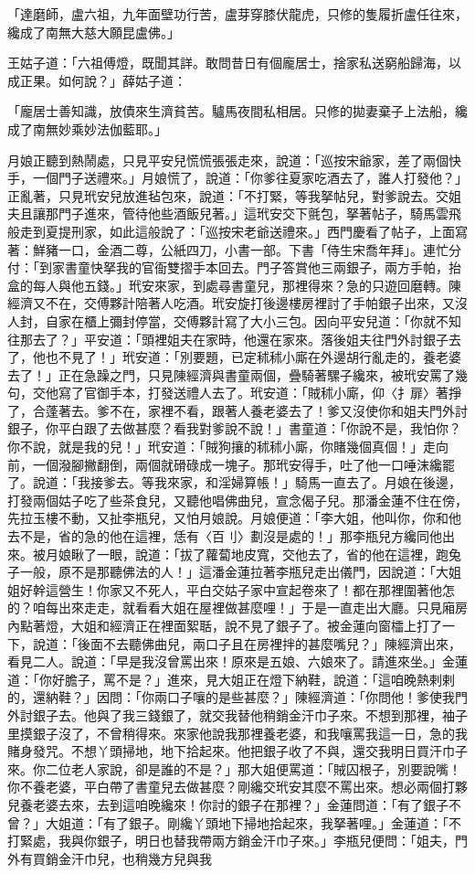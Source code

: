 「達磨師，盧六祖，九年面壁功行苦，盧芽穿膝伏龍虎，只修的隻履折盧任往來，纔成了南無大慈大願昆盧佛。」

王姑子道：「六祖傅燈，既聞其詳。敢問昔日有個龐居士，捨家私送窮船歸海，以成正果。如何說？」薛姑子道：

「龐居士善知識，放債來生濟貧苦。驢馬夜間私相居。只修的拋妻棄子上法船，纔成了南無妙乘妙法伽藍耶。」

月娘正聽到熱鬧處，只見平安兒慌慌張張走來，說道：「巡按宋爺家，差了兩個快手，一個門子送禮來。」月娘慌了，說道：「你爹往夏家吃酒去了，誰人打發他？」正亂著，只見玳安兒放進毡包來，說道：「不打緊，等我拏帖兒，對爹說去。交姐夫且讓那門子進來，管待他些酒飯兒著。」這玳安交下氈包，拏著帖子，騎馬雲飛般走到夏提刑家，如此這般說了：「巡按宋老爺送禮來。」西門慶看了帖子，上面寫著：鮮豬一口，金酒二尊，公紙四刀，小書一部。下書「侍生宋喬年拜」。連忙分付：「到家書童快拏我的官衙雙摺手本回去。門子答賞他三兩銀子，兩方手帕，抬盒的每人與他五錢。」玳安來家，到處尋書童兒，那裡得來？急的只遊回磨轉。陳經濟又不在，交傅夥計陪著人吃酒。玳安旋打後邊樓房裡討了手帕銀子出來，又沒人封，自家在櫃上彌封停當，交傅夥計寫了大小三包。因向平安兒道：「你就不知往那去了？」平安道：「頭裡姐夫在家時，他還在家來。落後姐夫往門外討銀子去了，他也不見了！」玳安道：「別要題，已定秫秫小廝在外邊胡行亂走的，養老婆去了！」正在急躁之門，只見陳經濟與書童兩個，疊騎著騾子纔來，被玳安罵了幾句，交他寫了官御手本，打發送禮人去了。玳安道：「賊秫小廝，仰〈扌扉〉著掙了，合蓬著去。爹不在，家裡不看，跟著人養老婆去了！爹又沒使你和姐夫門外討銀子，你平白跟了去做甚麼？看我對爹說不說！」書童道：「你說不是，我怕你？你不說，就是我的兒！」玳安道：「賊狗攘的秫秫小廝，你賭幾個真個！」走向前，一個潑腳撇翻倒，兩個就磆碌成一塊子。那玳安得手，吐了他一口唾沫纔罷了。說道：「我接爹去。等我來家，和淫婦算帳！」騎馬一直去了。月娘在後邊，打發兩個姑子吃了些茶食兒，又聽他唱佛曲兒，宣念偈子兒。那潘金蓮不住在傍，先拉玉樓不動，又扯李瓶兒，又怕月娘說。月娘便道：「李大姐，他叫你，你和他去不是，省的急的他在這裡，恁有〈百刂〉劃沒是處的！」那李瓶兒方纔同他出來。被月娘瞅了一眼，說道：「拔了蘿蔔地皮寬，交他去了，省的他在這裡，跑兔子一般，原不是那聽佛法的人！」這潘金蓮拉著李瓶兒走出儀門，因說道：「大姐姐好幹這營生！你家又不死人，平白交姑子家中宣起卷來了！都在那裡圍著他怎的？咱每出來走走，就看看大姐在屋裡做甚麼哩！」于是一直走出大廳。只見廂房內點著燈，大姐和經濟正在裡面絮聒，說不見了銀子了。被金蓮向窗櫺上打了一下，說道：「後面不去聽佛曲兒，兩口子且在房裡拌的甚麼嘴兒？」陳經濟出來，看見二人。說道：「早是我沒曾罵出來！原來是五娘、六娘來了。請進來坐。」金蓮道：「你好膽子，罵不是？」進來，見大姐正在燈下納鞋，說道：「這咱晚熱剌剌的，還納鞋？」因問：「你兩口子嚷的是些甚麼？」陳經濟道：「你問他！爹使我門外討銀子去。他與了我三錢銀了，就交我替他稍銷金汗巾子來。不想到那裡，袖子里摸銀子沒了，不曾稍得來。來家他說我那裡養老婆，和我嚷罵我這一日，急的我賭身發咒。不想丫頭掃地，地下拾起來。他把銀子收了不與，還交我明日買汗巾子來。你二位老人家說，卻是誰的不是？」那大姐便罵道：「賊囚根子，別要說嘴！你不養老婆，平白帶了書童兒去做甚麼？剛纔交玳安其麼不罵出來。想必兩個打夥兒養老婆去來，去到這咱晚纔來！你討的銀子在那裡？」金蓮問道：「有了銀子不曾？」大姐道：「有了銀子。剛纔丫頭地下掃地拾起來，我拏著哩。」金蓮道：「不打緊處，我與你銀子，明日也替我帶兩方銷金汗巾子來。」李瓶兒便問：「姐夫，門外有買銷金汗巾兒，也稍幾方兒與我